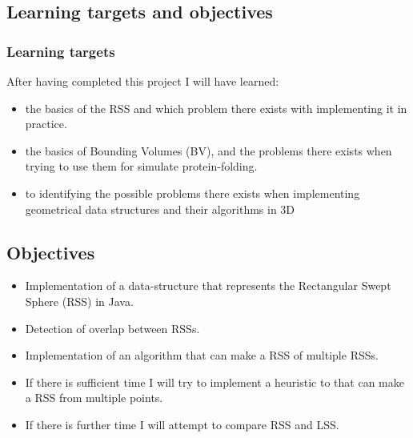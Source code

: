\subsection{Learning targets and objectives}
\label{learning}
\subsubsection{Learning targets}
After having completed this project I will have learned:
\begin{itemize}
\item the basics of the RSS and which problem there exists with implementing it in practice.
\item the basics of  Bounding Volumes (BV), and the problems there exists when trying to use them for simulate protein-folding.
\item to identifying the possible problems there exists when implementing geometrical data structures and their algorithms in 3D
\end{itemize}

\subsection{Objectives}
\begin{itemize}
\item Implementation of a data-structure that represents the Rectangular Swept Sphere (RSS) in Java.  
\item Detection of overlap between RSSs.
\item Implementation of an algorithm that can make a RSS of multiple RSSs.
\item If there is sufficient time I will try to implement a heuristic to that can make a RSS from multiple points.
\item If there is further time I will attempt to compare RSS and LSS.
\end{itemize}

